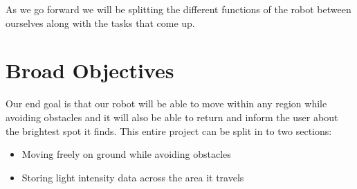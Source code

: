 \documentclass[a4paper, 12pt]{article}
\begin{document}
    \begin{table}[h]
        \caption{My caption}
        \label{my-label}
    \end{table}

    As we go forward we will be splitting the different functions of the robot between ourselves along with the tasks that come up.

    \section{Broad Objectives}

    Our end goal is that our robot will be able to move within any region while avoiding obstacles and it will also be able to return and inform the user about the brightest spot it finds.
    This entire project can be split in to two sections:

    \begin{itemize}
        \item Moving freely on ground while avoiding obstacles
        \item Storing light intensity data across the area it travels
    \end{itemize}
\end{document}
